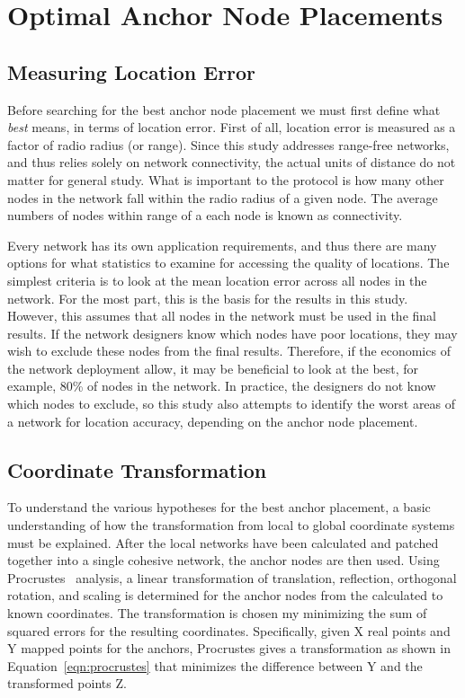 \chapter{Optimal Anchor Node Placements}
\label{chap:placments}
\section{Measuring Location Error}
Before searching for the best anchor node placement we must first define what \emph{best} means, in terms of location error.  First of all, location error is measured as a factor of radio radius (or range).  Since this study addresses range-free networks, and thus relies solely on network connectivity, the actual units of distance do not matter for general study.  What is important to the protocol is how many other nodes in the network fall within the radio radius of a given node.  The average numbers of nodes within range of a each node is known as connectivity.

Every network has its own application requirements, and thus there are many options for what statistics to examine for accessing the quality of locations.  The simplest criteria is to look at the mean location error across all nodes in the network.  For the most part, this is the basis for the results in this study.  However, this assumes that all nodes in the network must be used in the final results.  If the network designers know which nodes have poor locations, they may wish to exclude these nodes from the final results.  Therefore, if the economics of the network deployment allow, it may be beneficial to look at the best, for example, 80\% of nodes in the network.  In practice, the designers do not know which nodes to exclude, so this study also attempts to identify the worst areas of a network for location accuracy, depending on the anchor node placement.  

\section{Coordinate Transformation} \label{sec:procrustes}
To understand the various hypotheses for the best anchor placement, a basic understanding of how the transformation from local to global coordinate systems must be explained.  After the local networks have been calculated and patched together into a single cohesive network, the anchor nodes are then used. Using Procrustes~\cite{procrustes-matlab} analysis, a linear transformation of translation, reflection, orthogonal rotation, and scaling is determined for the anchor nodes from the calculated to known coordinates. The transformation is chosen my minimizing the sum of squared errors for the resulting coordinates.  Specifically, given X real points and Y mapped points for the anchors, Procrustes gives a transformation as shown in Equation~\ref{eqn:procrustes} that minimizes the difference between Y and the transformed points Z.


